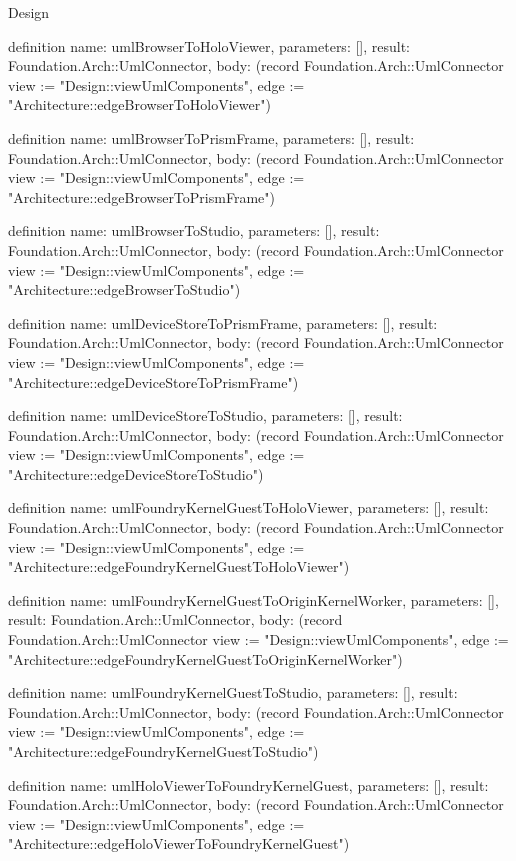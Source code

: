 \begin{lexlean}{Design}
\begin{semanticmodule}
definition{
  name: umlBrowserToHoloViewer,
  parameters: [],
  result: Foundation.Arch::UmlConnector,
  body: (record Foundation.Arch::UmlConnector {view := "Design::viewUmlComponents", edge := "Architecture::edgeBrowserToHoloViewer"})
}

definition{
  name: umlBrowserToPrismFrame,
  parameters: [],
  result: Foundation.Arch::UmlConnector,
  body: (record Foundation.Arch::UmlConnector {view := "Design::viewUmlComponents", edge := "Architecture::edgeBrowserToPrismFrame"})
}

definition{
  name: umlBrowserToStudio,
  parameters: [],
  result: Foundation.Arch::UmlConnector,
  body: (record Foundation.Arch::UmlConnector {view := "Design::viewUmlComponents", edge := "Architecture::edgeBrowserToStudio"})
}

definition{
  name: umlDeviceStoreToPrismFrame,
  parameters: [],
  result: Foundation.Arch::UmlConnector,
  body: (record Foundation.Arch::UmlConnector {view := "Design::viewUmlComponents", edge := "Architecture::edgeDeviceStoreToPrismFrame"})
}

definition{
  name: umlDeviceStoreToStudio,
  parameters: [],
  result: Foundation.Arch::UmlConnector,
  body: (record Foundation.Arch::UmlConnector {view := "Design::viewUmlComponents", edge := "Architecture::edgeDeviceStoreToStudio"})
}

definition{
  name: umlFoundryKernelGuestToHoloViewer,
  parameters: [],
  result: Foundation.Arch::UmlConnector,
  body: (record Foundation.Arch::UmlConnector {view := "Design::viewUmlComponents", edge := "Architecture::edgeFoundryKernelGuestToHoloViewer"})
}

definition{
  name: umlFoundryKernelGuestToOriginKernelWorker,
  parameters: [],
  result: Foundation.Arch::UmlConnector,
  body: (record Foundation.Arch::UmlConnector {view := "Design::viewUmlComponents", edge := "Architecture::edgeFoundryKernelGuestToOriginKernelWorker"})
}

definition{
  name: umlFoundryKernelGuestToStudio,
  parameters: [],
  result: Foundation.Arch::UmlConnector,
  body: (record Foundation.Arch::UmlConnector {view := "Design::viewUmlComponents", edge := "Architecture::edgeFoundryKernelGuestToStudio"})
}

definition{
  name: umlHoloViewerToFoundryKernelGuest,
  parameters: [],
  result: Foundation.Arch::UmlConnector,
  body: (record Foundation.Arch::UmlConnector {view := "Design::viewUmlComponents", edge := "Architecture::edgeHoloViewerToFoundryKernelGuest"})
}


\end{semanticmodule}
\end{lexlean}
